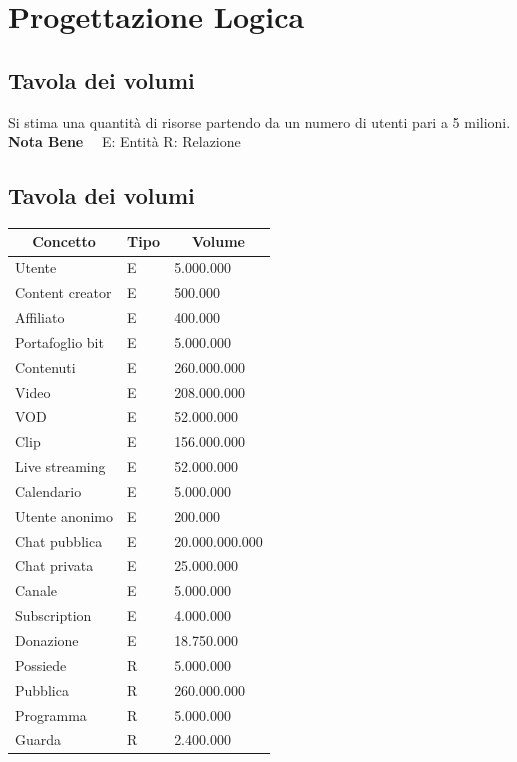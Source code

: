 \section{Progettazione Logica}
\subsection{Tavola dei volumi}
Si stima una quantità di risorse partendo da un numero di utenti pari a 5 milioni. \\
\textbf{Nota Bene} \ \ E: Entità R: Relazione 
\subsection{Tavola dei volumi}
\begin{center}
\begin{tabular}{ |p{5cm}|p{2cm}|p{4cm}|  }
 \hline
 \multicolumn{1}{|c|}{\textbf{Concetto}} 
 & \multicolumn{1}{|c|}{\textbf{Tipo}} 
 & \multicolumn{1}{|c|}{\textbf{Volume}}\\
  \hline
 Utente & E & 5.000.000\\
  \hline
 Content creator & E & 500.000\\
 \hline 
  Affiliato & E & 400.000\\
 \hline
 Portafoglio bit & E & 5.000.000\\
 \hline
 Contenuti & E & 260.000.000\\
 \hline
  Video & E & 208.000.000\\
 \hline
 VOD & E & 52.000.000\\
 \hline
 Clip & E & 156.000.000\\
 \hline
 Live streaming & E & 52.000.000\\
 \hline
 Calendario & E & 5.000.000\\
 \hline 
  Utente anonimo & E & 200.000\\
 \hline
 Chat pubblica & E & 20.000.000.000\\
 \hline
 Chat privata & E & 25.000.000\\
 \hline
 Canale & E & 5.000.000\\
 \hline 
 Subscription & E & 4.000.000\\
 \hline
 Donazione & E & 18.750.000\\
 \hline
 Possiede & R & 5.000.000\\
 \hline
 Pubblica & R & 260.000.000\\
 \hline
 Programma & R & 5.000.000\\
 \hline
 Guarda & R & 2.400.000\\

\end{tabular}
\end{center}
